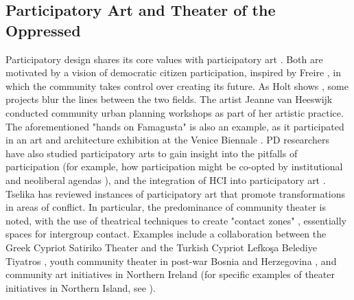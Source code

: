 \documentclass[dissertation,math,vertlayout,pdfa,colorlinks]{aaltoseries}
\begin{document}
\subsection{Participatory Art and Theater of the Oppressed}
Participatory design shares its core values with participatory art \cite{holtTransformationAestheticArt2015}. Both are motivated by a vision of democratic citizen participation, inspired by Freire \cite{matarassoRestlessArt2019}, in which the community takes control over creating its future. As Holt shows \cite{holtTransformationAestheticArt2015}, some projects blur the lines between the two fields. The artist Jeanne van Heeswijk conducted community urban planning workshops as part of her artistic practice\cite{vanheeswijkInclusiveUrbanStrategies2011}. The aforementioned "hands on Famagusta" is also an example, as it participated in an art and architecture exhibition at the Venice Biennale \cite{stratisReclaimingPoliticalUrbanism2017}. PD researchers have also studied participatory arts to gain insight into the pitfalls of participation (for example, how participation might be co-opted by institutional and neoliberal agendas \cite{balaGesturesParticipatoryArt2018}), and the integration of HCI into participatory art \cite{holmerConstructingConstrainingParticipation2015}. Tselika \cite{tselikaConflictTransformationArt2019} has reviewed instances of participatory art that promote transformations in areas of conflict. In particular, the predominance of community theater is noted, with the use of theatrical techniques to create "contact zones" \cite{prattImperialEyesTravel2008}, essentially spaces for intergroup contact. Examples include a collaboration between the Greek Cypriot Satiriko Theater and the Turkish Cypriot Lefkoşa Belediye Tiyatros \cite[p.17]{tselikaConflictTransformationArt2019}, youth community theater in post-war Bosnia and Herzegovina \cite{zelizerRoleArtisticProcesses2003}, and community art initiatives in Northern Ireland (for specific examples of theater initiatives in Northern Island, see \cite{pierseCreativelyConnectingCivil2020}).
\end{document}
